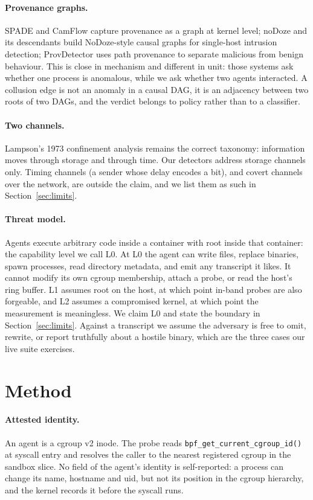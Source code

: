 \documentclass[11pt]{article}
\begin{document}
\paragraph{Provenance graphs.} SPADE and CamFlow capture provenance as a graph at
kernel level; noDoze and its descendants build NoDoze-style causal graphs for
single-host intrusion detection; ProvDetector uses path provenance to separate
malicious from benign behaviour. This is close in mechanism and different in unit:
those systems ask whether one process is anomalous, while we ask whether two agents
interacted. A collusion edge is not an anomaly in a causal DAG, it is an adjacency
between two roots of two DAGs, and the verdict belongs to policy rather than to a
classifier.

\paragraph{Two channels.} Lampson's 1973 confinement analysis remains the correct
taxonomy: information moves through storage and through time. Our detectors address
storage channels only. Timing channels (a sender whose delay encodes a bit), and
covert channels over the network, are outside the claim, and we list them as such
in Section~\ref{sec:limits}.

\paragraph{Threat model.} Agents execute arbitrary code inside a container with
root inside that container: the capability level we call L0. At L0 the agent can
write files, replace binaries, spawn processes, read directory metadata, and emit
any transcript it likes. It cannot modify its own cgroup membership, attach a
probe, or read the host's ring buffer. L1 assumes root on the host, at which point
in-band probes are also forgeable, and L2 assumes a compromised kernel, at which
point the measurement is meaningless. We claim L0 and state the boundary in
Section~\ref{sec:limits}. Against a transcript we assume the adversary is free to
omit, rewrite, or report truthfully about a hostile binary, which are the three
cases our live suite exercises.

\section{Method}

\paragraph{Attested identity.} An agent is a cgroup v2 inode. The probe reads
\texttt{bpf\_get\_current\_cgroup\_id()} at syscall entry and resolves the caller to
the nearest registered cgroup in the sandbox slice. No field of the agent's
identity is self-reported: a process can change its name, hostname and uid, but
not its position in the cgroup hierarchy, and the kernel records it before the
syscall runs.
\end{document}
